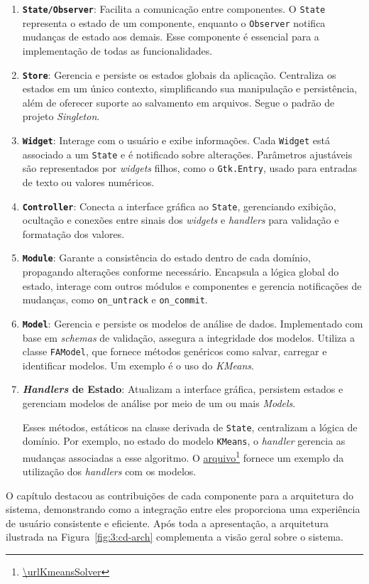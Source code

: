 \begin{enumerate}
    \item \textbf{\texttt{State/Observer}}: Facilita a comunicação entre componentes. O \texttt{State} representa o estado de um componente, enquanto o \texttt{Observer} notifica mudanças de estado aos demais. Esse componente é essencial para a implementação de todas as funcionalidades.

    \item \textbf{\texttt{Store}}: Gerencia e persiste os estados globais da aplicação. Centraliza os estados em um único contexto, simplificando sua manipulação e persistência, além de oferecer suporte ao salvamento em arquivos. Segue o padrão de projeto \textit{Singleton}.

    \item \textbf{\texttt{Widget}}: Interage com o usuário e exibe informações. Cada \texttt{Widget} está associado a um \texttt{State} e é notificado sobre alterações. Parâmetros ajustáveis são representados por \textit{widgets} filhos, como o \texttt{Gtk.Entry}, usado para entradas de texto ou valores numéricos.

    \item \textbf{\texttt{Controller}}: Conecta a interface gráfica ao \texttt{State}, gerenciando exibição, ocultação e conexões entre sinais dos \textit{widgets} e \textit{handlers} para validação e formatação dos valores.

    \item \textbf{\texttt{Module}}: Garante a consistência do estado dentro de cada domínio, propagando alterações conforme necessário. Encapsula a lógica global do estado, interage com outros módulos e componentes e gerencia notificações de mudanças, como \texttt{on\_untrack} e \texttt{on\_commit}.

    \item \textbf{\texttt{Model}}: Gerencia e persiste os modelos de análise de dados. Implementado com base em \textit{schemas} de validação, assegura a integridade dos modelos. Utiliza a classe \texttt{FAModel}, que fornece métodos genéricos como salvar, carregar e identificar modelos. Um exemplo é o uso do \textit{KMeans}.

    \item \textbf{\textit{Handlers} de Estado}: Atualizam a interface gráfica, persistem estados e gerenciam modelos de análise por meio de um ou mais \textit{Models}.
    
    Esses métodos, estáticos na classe derivada de \texttt{State}, centralizam a lógica de domínio. Por exemplo, no estado do modelo \texttt{KMeans}, o \textit{handler} gerencia as mudanças associadas a esse algoritmo. O \href{\urlKmeansSolver}{\underline{arquivo}}\footnote{\url{\urlKmeansSolver}} fornece um exemplo da utilização dos \textit{handlers} com os modelos.
\end{enumerate}

O capítulo destacou as contribuições de cada componente para a arquitetura do sistema, demonstrando como a integração entre eles proporciona uma experiência de usuário consistente e eficiente. Após toda a apresentação, a arquitetura ilustrada na Figura~\ref{fig:3:cd-arch} complementa a visão geral sobre o sistema.